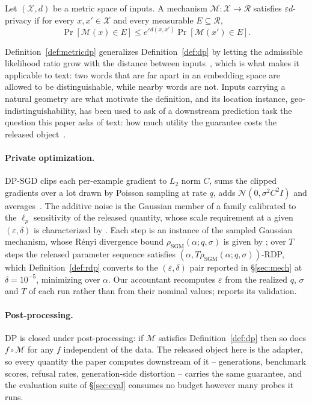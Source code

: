 \begin{definition}
  \label{def:metricdp}
  Let $(\mathcal{X}, d)$ be a metric space of inputs.
  A mechanism $\mathcal{M} \colon \mathcal{X} \to \mathcal{R}$ satisfies $\varepsilon d$-privacy if for every $x, x' \in \mathcal{X}$ and every measurable $E \subseteq \mathcal{R}$,
  \begin{equation}
    \Pr[\mathcal{M}(x) \in E] \le e^{\varepsilon d(x, x')} \Pr[\mathcal{M}(x') \in E] .
    \label{eq:metricdp}
  \end{equation}
\end{definition}
Definition~\ref{def:metricdp} generalizes Definition~\ref{def:dp} by letting the admissible likelihood ratio grow with the distance between inputs~\citep{chatzikokolakis2013broadening},
which is what makes it applicable to text:
two words that are far apart in an embedding space are allowed to be distinguishable,
while nearby words are not.
Inputs carrying a natural geometry are what motivate the definition,
and its location instance,
geo-indistinguishability,
has been used to ask of a downstream prediction task the question this paper asks of text:
how much utility the guarantee costs the released object~\citep{liu2021privacy}.

\paragraph{Private optimization.}
DP-SGD clips each per-example gradient to $L_2$ norm $C$,
sums the clipped gradients over a lot drawn by Poisson sampling at rate $q$,
adds $\mathcal{N}(0, \sigma^2 C^2 I)$ and averages~\citep{abadi2016deep}.
The additive noise is the Gaussian member of a family calibrated to the $\ell_p$ sensitivity of the released quantity,
whose scale requirement at a given $(\varepsilon, \delta)$ is characterized by \citet{liu2019ggm}.
Each step is an instance of the sampled Gaussian mechanism,
whose R\'enyi divergence bound $\rho_{\mathrm{SGM}}(\alpha; q, \sigma)$ is given by \citet{mironov2019sgm};
over $T$ steps the released parameter sequence satisfies $(\alpha, T \rho_{\mathrm{SGM}}(\alpha; q, \sigma))$-RDP,
which Definition~\ref{def:rdp} converts to the $(\varepsilon, \delta)$ pair reported in \S\ref{sec:mech} at $\delta = 10^{-5}$,
minimizing over $\alpha$.
Our accountant recomputes $\varepsilon$ from the realized $q$,
$\sigma$ and $T$ of each run rather than from their nominal values;
 reports its validation.

\paragraph{Post-processing.}
DP is closed under post-processing:
if $\mathcal{M}$ satisfies Definition~\ref{def:dp} then so does $f \circ \mathcal{M}$ for any $f$ independent of the data.
The released object here is the adapter,
so every quantity the paper computes downstream of it -- generations,
benchmark scores,
refusal rates,
generation-side distortion -- carries the same guarantee,
and the evaluation suite of \S\ref{sec:eval} consumes no budget however many probes it runs.

